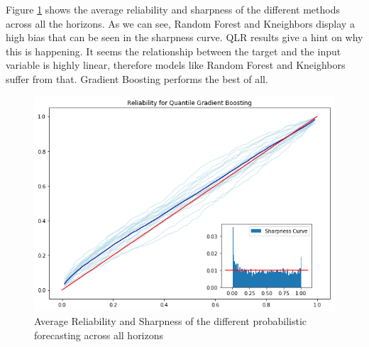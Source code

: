 \documentclass[a4paper,twocolumn,5p]{elsarticle}
\begin{document}
Figure \ref{figure:rel_sharp} shows the average reliability and sharpness of the 
different methods across all the horizons. 
As we can see, Random Forest and Kneighbors display a high bias that can be seen in the 
sharpness curve. QLR results give a hint on why this is happening. It seems the relationship
between the target and the input variable is highly linear, therefore models like Random 
Forest and Kneighbors suffer from that. Gradient Boosting performs the best of all.

\begin{figure}
  \centering
  \includegraphics[width=1\textwidth]{reliability_sharpness}
  \caption{Average Reliability and Sharpness of the different probabilistic forecasting
  across all horizons}
  \label{figure:rel_sharp}
\end{figure}
\end{document}
